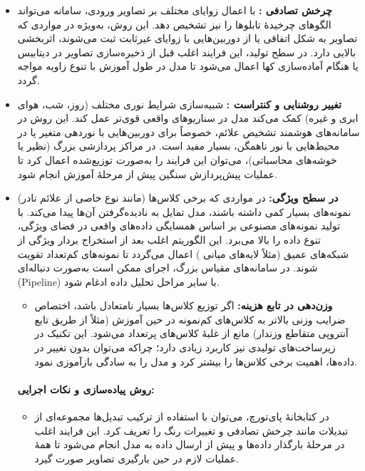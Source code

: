 \begin{itemize}
    \item \textbf{چرخش تصادفی :}
    با اعمال زوایای مختلف بر تصاویر ورودی، سامانه می‌تواند الگوهای چرخیدهٔ تابلوها را نیز تشخیص دهد. این روش، به‌ویژه در مواردی که تصاویر به شکل اتفاقی یا از دوربین‌هایی با زوایای غیرثابت ثبت می‌شوند، اثربخشی بالایی دارد. در سطح تولید، این فرایند اغلب قبل از ذخیره‌سازی تصاویر در دیتابیس یا هنگام آماده‌سازی کها اعمال می‌شود تا مدل در طول آموزش با تنوع زاویه مواجه گردد.

    \item \textbf{تغییر روشنایی و کنتراست :}
    شبیه‌سازی شرایط نوری مختلف (روز، شب، هوای ابری و غیره) کمک می‌کند مدل در سناریوهای واقعی قوی‌تر عمل کند. این روش در سامانه‌های هوشمند تشخیص علائم، خصوصاً برای دوربین‌هایی با نوردهی متغیر یا در محیط‌هایی با نور ناهمگن، بسیار مفید است. در مراکز پردازشی بزرگ (نظیر  یا خوشه‌های محاسباتی)، می‌توان این فرایند را به‌صورت توزیع‌شده اعمال کرد تا عملیات پیش‌پردازش سنگین پیش از مرحلهٔ آموزش انجام شود.

    \item \textbf{ در سطح ویژگی:}
    در مواردی که برخی کلاس‌ها (مانند نوع خاصی از علائم نادر) نمونه‌های بسیار کمی داشته باشند، مدل تمایل به نادیده‌گرفتن آن‌ها پیدا می‌کند.  با تولید نمونه‌های مصنوعی بر اساس همسایگی داده‌های واقعی در فضای ویژگی، تنوع داده را بالا می‌برد. این الگوریتم اغلب بعد از استخراج بردار ویژگی از شبکه‌های عمیق (مثلاً لایه‌های میانی ) اعمال می‌گردد تا نمونه‌های کم‌تعداد تقویت شوند. در سامانه‌های مقیاس بزرگ، اجرای  ممکن است به‌صورت دنباله‌ای (Pipeline) با سایر مراحل تحلیل داده ادغام شود.



\begin{itemize}
    \item \textbf{وزن‌دهی در تابع هزینه:}
    اگر توزیع کلاس‌ها بسیار نامتعادل باشد، اختصاص ضرایب وزنی بالاتر به کلاس‌های کم‌نمونه در حین آموزش (مثلاً از طریق تابع آنتروپی متقاطع وزندار) مانع از غلبهٔ کلاس‌های پرتعداد می‌شود. این تکنیک در زیرساخت‌های تولیدی نیز کاربرد زیادی دارد؛ چراکه می‌توان بدون تغییر در داده‌ها، اهمیت برخی کلاس‌ها را بیشتر کرد و مدل را به سادگی بازآموزی نمود.
\end{itemize}

\paragraph{روش پیاده‌سازی و نکات اجرایی:}
\begin{itemize}
    \item در کتابخانهٔ پای‌تورچ، می‌توان با استفاده از ترکیب تبدیل‌ها مجموعه‌ای از تبدیلات مانند چرخش تصادفی و تغییرات رنگ را تعریف کرد. این فرایند اغلب در مرحلهٔ بارگذار داده‌ها و پیش از ارسال داده به مدل انجام می‌شود تا همهٔ عملیات لازم در حین بارگیری تصاویر صورت گیرد.
    

\end{itemize}
\end{itemize}

